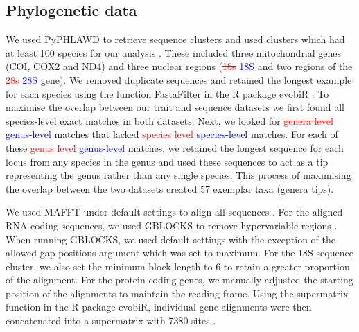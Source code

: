 \documentclass[]{rsos}%
\begin{document}
\subsection{Phylogenetic data}
We used PyPHLAWD to retrieve sequence clusters and used clusters which had at least 100 species for our analysis \cite{smith2018phyphlawd}. 
These included three mitochondrial genes (COI, COX2 and ND4) and three nuclear
regions (\textcolor{red}{\st{18s}} \textcolor{blue}{18S} and two regions of the \textcolor{red}{\st{28s}} \textcolor{blue}{28S} gene). 
We removed duplicate sequences and retained the longest example for each species using the function FastaFilter in the R package evobiR \cite{blackmon2015evobir}.
To maximise the overlap between our trait and sequence datasets we first found all species-level exact matches in both datasets.
Next, we looked for \textcolor{red}{\st{genera level}} \textcolor{blue}{genus-level} matches that lacked \textcolor{red}{\st{species level}} \textcolor{blue}{species-level} matches.
For each of these \textcolor{red}{\st{genus level}} \textcolor{blue}{genus-level} matches, we retained the longest sequence for each locus from any species in the genus and used these sequences to act as a tip representing the genus rather than any single species. 
This process of maximising the overlap between the two datasets created 57 exemplar taxa (genera tips).

We used MAFFT under default settings to align all sequences \cite{katoh2013mafft}.
For the aligned RNA coding sequences, we used GBLOCKS to remove hypervariable regions \cite{castresana2000gblocks}. 
When running GBLOCKS, we used default settings with the exception of the allowed gap positions argument which was set to maximum. 
For the 18S sequence cluster, we also set the minimum block length to 6 to retain a greater proportion of the alignment. 
For the protein-coding genes, we manually adjusted the starting position of the alignments to maintain the reading frame. 
Using the supermatrix function in the R package evobiR, individual gene alignments were then concatenated into a supermatrix with 7380 sites \cite{blackmon2015evobir}.
\end{document}
